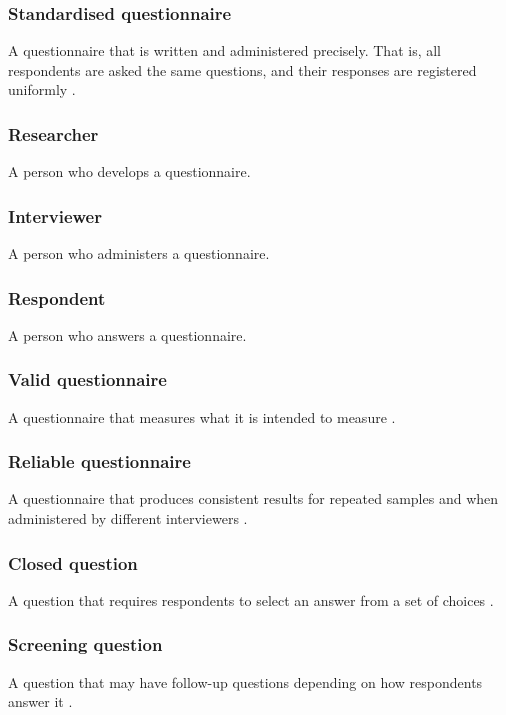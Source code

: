 \subsubsection{Standardised questionnaire}
A questionnaire that is written and administered precisely. That is, all respondents are asked the same questions, and their responses are registered uniformly \cite{Boynton2004c}.

\subsubsection{Researcher}
A person who develops a questionnaire.

\subsubsection{Interviewer}
A person who administers a questionnaire.

\subsubsection{Respondent}
A person who answers a questionnaire.

\subsubsection{Valid questionnaire}
A questionnaire that measures what it is intended to measure \cite{Boynton2004c}.

\subsubsection{Reliable questionnaire}
A questionnaire that produces consistent results for repeated samples and when administered by different interviewers \cite{Boynton2004c}.

\subsubsection{Closed question}
A question that requires respondents to select an answer from a set of choices \cite{Krosnick2009}.

\subsubsection{Screening question}
A question that may have follow-up questions depending on how respondents answer it \cite{Krosnick2009}.

